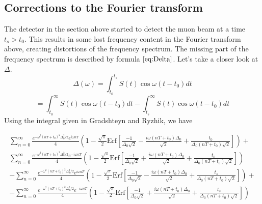 \subsection{Corrections to the Fourier transform} The detector in the section above started to detect the muon beam at a time $t_s>t_0$. This results in some lost frequency content in the Fourier transform above, creating distortions of the frequency spectrum. The missing part of the frequency spectrum is described by formula$~\eqref{eq:Delta}$. Let's take a closer look at $\Delta$. \[\Delta(\omega)=\int^{t_s}_{t_0}S(t)\cos\omega(t-t_0)dt\]\[=\int^{\infty}_{t_0}S(t)\cos\omega(t-t_0)dt-\int^{\infty}_{t_s}S(t)\cos\omega(t-t_0)dt\] Using the integral given in Gradshteyn and Ryzhik, we have 

\begin{gather}
\sum^{\infty}_{n=0}\frac{e^{-\omega^2(nT+t_0)^2\Delta^2_0/2}e^{i\omega nT}}{4}\left(1-\frac{\sqrt{\pi}}{2}\text{Erf}\left[\frac{-1}{\Delta_0\sqrt{2}}-\frac{i\omega (nT+t_0)\Delta_0}{\sqrt{2}}+\frac{t_0}{\Delta_0(nT+t_0)\sqrt{2}}\right]\right)+ \nonumber \\
\sum^{\infty}_{n=0}\frac{e^{-\omega^2(nT+t_0)^2\Delta^2_0/2}e^{-i\omega nT}}{4}\left(1-\frac{\sqrt{\pi}}{2}\text{Erf}\left[\frac{-1}{\Delta_0\sqrt{2}}+\frac{i\omega (nT+t_0)\Delta_0}{\sqrt{2}}+\frac{t_0}{\Delta_0(nT+t_0)\sqrt{2}}\right]\right) \nonumber \\
-\sum^{\infty}_{n=0}\frac{e^{-\omega^2(nT+t_0)^2\Delta^2_0/2}e^{i\omega nT}}{4}\left(1-\frac{\sqrt{\pi}}{2}\text{Erf}\left[\frac{-1}{\Delta_0\sqrt{2}}-\frac{i\omega (nT+t_0)\Delta_0}{\sqrt{2}}+\frac{t_s}{\Delta_0(nT+t_0)\sqrt{2}}\right]\right)+ \nonumber \\
-\sum^{\infty}_{n=0}\frac{e^{-\omega^2(nT+t_0)^2\Delta^2_0/2}e^{-i\omega nT}}{4}\left(1-\frac{\sqrt{\pi}}{2}\text{Erf}\left[\frac{-1}{\Delta_0\sqrt{2}}+\frac{i\omega (nT+t_0)\Delta_0}{\sqrt{2}}+\frac{t_s}{\Delta_0(nT+t_0)\sqrt{2}}\right]\right)
\end{gather}

